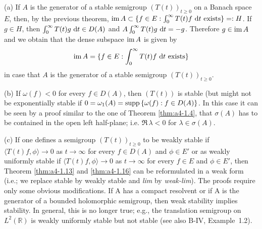 \begin{remark}\label{rem:a4-1.17}
(a) If $A$ is the generator of a stable semigroup
$(T(t))_{t \geq 0}$ on a Banach space $E$, then, by the previous theorem,
$\mathop{}\!\mathrm{im}\, A \subset \{f \in E : \int_{0}^{\infty} T(t)f \,\mathop{}\!\mathrm{d}{t} \text{ exists}\} =: H$.
If $g \in H$, then $\int_{0}^{\infty} T(t)g \,\mathop{}\!\mathrm{d}{t} \in D(A)$ and $A \int_{0}^{\infty} T(t)g \,\mathop{}\!\mathrm{d}{t} = -g$. 
Therefore $g \in \mathop{}\!\mathrm{im}\, A$ and we obtain that the dense subspace $\mathop{}\!\mathrm{im}\, A$ is given
by
\begin{equation}\label{eq:a4-1.14}
\mathop{}\!\mathrm{im}\, A = \{f \in E : \int_{0}^{\infty} T(t)f \,\mathop{}\!\mathrm{d}{t} \text{ exists}\}
\end{equation}
in case that $A$ is the generator of a stable semigroup $(T(t))_{t \geq 0}$.


(b) If $\omega(f) < 0$ for every $f \in D(A)$, then $(T(t))$ is stable (but
might not be exponentially stable if
$0 = \omega_{1}(A) = \mathop{}\!\mathrm{supp}\,\{\omega(f) : f \in D(A)\}$. 
In this case it can be seen by a
proof similar to the one of Theorem \ref{thm:a4-1.4}, that $\sigma(A)$ has to be contained
in the open left half-plane; i.e. $\Re\,\lambda < 0$ for $\lambda \in \sigma(A)$.


(c) If one defines a semigroup $(T(t))_{t \geq 0}$ to be weakly stable if
$\langle T(t)f,\phi \rangle \to 0$ as $t \to \infty$ for every $f \in D(A)$ and $\phi \in E'$ or as
weakly uniformly stable if $\langle T(t)f,\phi \rangle \to 0$ as $t \to \infty$ for every $f \in E$
and $\phi \in E'$, then Theorem \ref{thm:a4-1.13} and \ref{thm:a4-1.16} can be reformulated in a weak form (i.e.; we replace stable by weakly stable and \emph{lim} by
\emph{weak-lim}). 
The proofs require only some obvious modifications.
If A has a compact resolvent or if A is the generator of a bounded
holomorphic semigroup, then weak stability implies stability. 
In general, this is no longer true; e.g., the translation semigroup on
$L^{2}(\mathbb{R})$ is weakly uniformly stable but not stable (see also
B-IV, Example~1.2).
\end{remark}

